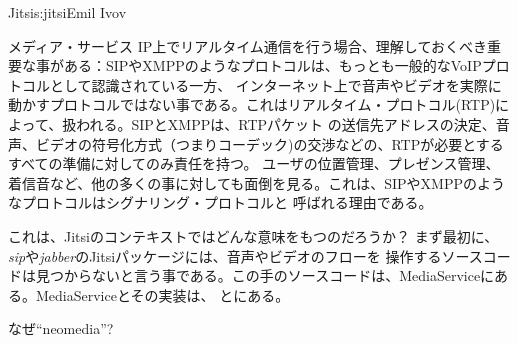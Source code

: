 \begin{aosachapter}{Jitsi}{s:jitsi}{Emil Ivov}
\begin{aosasect1}{メディア・サービス}
IP上でリアルタイム通信を行う場合、理解しておくべき重要な事がある：SIPやXMPPのようなプロトコルは、もっとも一般的なVoIPプロトコルとして認識されている一方、
インターネット上で音声やビデオを実際に動かすプロトコルではない事である。これはリアルタイム・プロトコル(RTP)によって、扱われる。SIPとXMPPは、RTPパケット
の送信先アドレスの決定、音声、ビデオの符号化方式（つまりコーデック)の交渉などの、RTPが必要とするすべての準備に対してのみ責任を持つ。
ユーザの位置管理、プレゼンス管理、着信音など、他の多くの事に対しても面倒を見る。これは、SIPやXMPPのようなプロトコルはシグナリング・プロトコルと
呼ばれる理由である。

これは、Jitsiのコンテキストではどんな意味をもつのだろうか？ まず最初に、\emph{sip}や\emph{jabber}のJitsiパッケージには、音声やビデオのフローを
操作するソースコードは見つからないと言う事である。この手のソースコードは、MediaServiceにある。MediaServiceとその実装は、
とにある。

\begin{aosabox}{なぜ``neomedia''?}


\end{aosabox}
\end{aosasect1}
\end{aosachapter}
